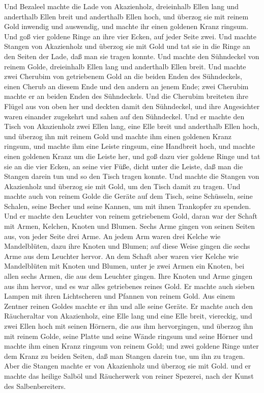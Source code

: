  Und Bezaleel machte die Lade von Akazienholz, dreieinhalb
Ellen lang und anderthalb Ellen breit und anderthalb Ellen hoch,
 und überzog sie mit reinem Gold inwendig und auswendig,
und machte ihr einen goldenen Kranz ringsum.  Und goß vier
goldene Ringe an ihre vier Ecken, auf jeder Seite zwei. 
Und machte Stangen von Akazienholz und überzog sie mit Gold
 und tat sie in die Ringe an den Seiten der Lade, daß man
sie tragen konnte.  Und machte den Sühndeckel von reinem
Golde, dreieinhalb Ellen lang und anderthalb Ellen breit. 
Und machte zwei Cherubim von getriebenem Gold an die beiden Enden des
Sühndeckels,  einen Cherub an diesem Ende und den andern
an jenem Ende; zwei Cherubim machte er an beiden Enden des Sühndeckels.
 Und die Cherubim breiteten ihre Flügel aus von oben her
und deckten damit den Sühndeckel, und ihre Angesichter waren einander
zugekehrt und sahen auf den Sühndeckel.  Und er machte
den Tisch von Akazienholz zwei Ellen lang, eine Elle breit und
anderthalb Ellen hoch,  und überzog ihn mit reinem Gold
und machte ihm einen goldenen Kranz ringsum,  und machte
ihm eine Leiste ringsum, eine Handbreit hoch, und machte einen goldenen
Kranz um die Leiste her,  und goß dazu vier goldene Ringe
und tat sie an die vier Ecken, an seine vier Füße,  dicht
unter die Leiste, daß man die Stangen darein tun und so den Tisch tragen
konnte.  Und machte die Stangen von Akazienholz und
überzog sie mit Gold, um den Tisch damit zu tragen.  Und
machte auch von reinem Golde die Geräte auf dem Tisch, seine Schüsseln,
seine Schalen, seine Becher und seine Kannen, um mit ihnen Trankopfer zu
spenden.  Und er machte den Leuchter von reinem
getriebenem Gold, daran war der Schaft mit Armen, Kelchen, Knoten und
Blumen.  Sechs Arme gingen von seinen Seiten aus, von
jeder Seite drei Arme.  An jedem Arm waren drei Kelche
wie Mandelblüten, dazu ihre Knoten und Blumen; auf diese Weise gingen
die sechs Arme aus dem Leuchter hervor.  An dem Schaft
aber waren vier Kelche wie Mandelblüten mit Knoten und Blumen,
 unter je zwei Armen ein Knoten, bei allen sechs Armen,
die aus dem Leuchter gingen.  Ihre Knoten und Arme gingen
aus ihm hervor, und es war alles getriebenes reines Gold.
 Er machte auch sieben Lampen mit ihren Lichtscheren und
Pfannen von reinem Gold.  Aus einem Zentner reinen Goldes
machte er ihn und alle seine Geräte.  Er machte auch den
Räucheraltar von Akazienholz, eine Elle lang und eine Elle breit,
viereckig, und zwei Ellen hoch mit seinen Hörnern, die aus ihm
hervorgingen,  und überzog ihn mit reinem Golde, seine
Platte und seine Wände ringsum und seine Hörner und machte ihm einen
Kranz ringsum von reinem Gold;  und zwei goldene Ringe
unter dem Kranz zu beiden Seiten, daß man Stangen darein tue, um ihn zu
tragen.  Aber die Stangen machte er von Akazienholz und
überzog sie mit Gold.  und er machte das heilige Salböl
und Räucherwerk von reiner Spezerei, nach der Kunst des Salbenbereiters.

